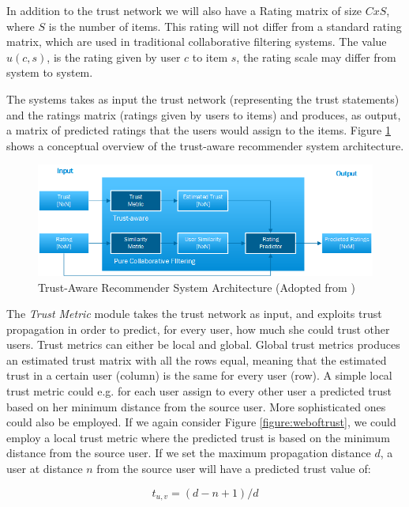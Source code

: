 In addition to the trust network we will also have a Rating matrix of size $CxS$, where $S$ is
the number of items. This rating will not differ from a standard rating matrix,
which are used in traditional collaborative filtering systems. The value $u(c,s)$, is the rating given by user $c$ to item $s$, the rating scale may differ from system to system.

The systems takes as input the trust network (representing the trust
statements) and the ratings matrix (ratings given by users to items) and
produces, as output, a matrix of predicted ratings that the users would assign
to the items. Figure \ref{figure:trustarchictecture} shows a conceptual
overview of the trust-aware recommender system architecture.

\begin{figure}[H]
    \includegraphics[width=5in]{image/trustawarearchitecture.png}
    \centering
    \caption[Trust-Aware Recommender System Architecture]{Trust-Aware
    Recommender System Architecture (Adopted from \cite{Massa2004})}
    \label{figure:trustarchictecture}
\end{figure}

The \emph{Trust Metric} module takes the trust network as input, and exploits
trust propagation in order to predict, for every user, how much she could trust
other users. Trust metrics can either be local and global. Global trust metrics
produces an estimated trust matrix with all the rows equal, meaning that the
estimated trust in a certain user (column) is the same for every user (row). A
simple local trust metric could e.g. for each user assign to every other user a
predicted trust based on her minimum distance from the source user. More
sophisticated ones could also be employed. If we again consider Figure
\ref{figure:weboftrust}, we could employ a local trust metric where the
predicted trust is based on the minimum distance from the source user. If we
set the maximum propagation distance $d$, a user at distance $n$ from the
source user will have a predicted trust value of:

\begin{equation}
t_{u,v} = (d-n+1)/d
\end{equation}

